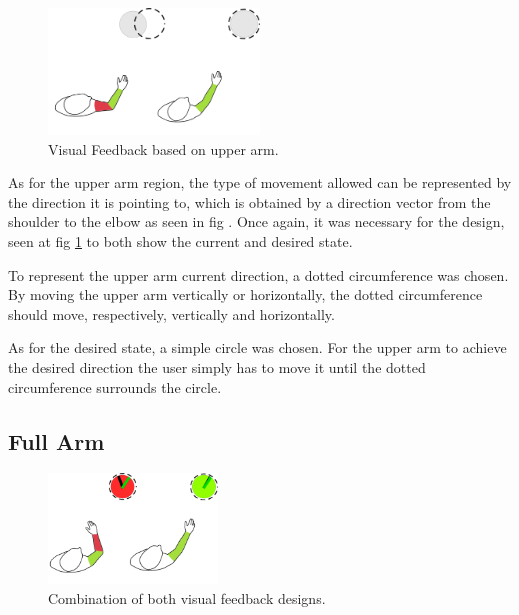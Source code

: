 \begin{figure}[!t]
    \begin{center}
        \includegraphics[width=0.5\textwidth]{imgs/upperarmfeedback.png}
    \end{center}
    \caption{Visual Feedback based on upper arm.}
    \label{fig:upperarmfeedback}
\end{figure}

As for the upper arm region, the type of movement allowed can be represented by the direction it is pointing to, which is obtained by a direction vector from the shoulder to the elbow as seen in fig .
Once again, it was necessary for the design, seen at fig \ref{fig:upperarmfeedback} to both show the current and desired state. 


To represent the upper arm current direction, a dotted circumference was chosen. By moving the upper arm vertically or horizontally, the dotted circumference should move, respectively, vertically and horizontally.


As for the desired state, a simple circle was chosen. For the upper arm to achieve the desired direction the user simply has to move it until the dotted circumference surrounds the circle.

\subsection{Full Arm}

\begin{figure}[!b]
    \begin{center}
        \includegraphics[width=0.4\textwidth]{imgs/fullarmfeedback.png}
    \end{center}
    \caption{Combination of both visual feedback designs.}
    \label{fig:fullarmfeedback}
\end{figure}


